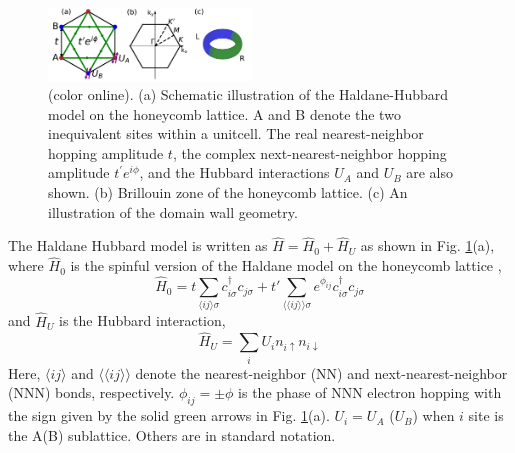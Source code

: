 \documentclass[amsmath,superscriptaddress,showpacs,aps,prl,twocolumn]{revtex4-1}
\begin{document}
\begin{figure}
\centering
\includegraphics[width=0.48\textwidth]{lattice}
\caption{(color online). (a) Schematic illustration of the Haldane-Hubbard model on the honeycomb lattice. A and B denote the two inequivalent sites within a unitcell. The real nearest-neighbor hopping amplitude $t$, the complex next-nearest-neighbor hopping amplitude $t^\prime e^{i\phi}$, and the Hubbard interactions $U_A$ and $U_B$ are also shown. (b) Brillouin zone of the honeycomb lattice. (c) An illustration of the domain wall geometry.}
\label{lattice}
\end{figure}

\par The Haldane Hubbard model is written as $\hat{H}=\hat{H}_0+\hat{H}_U$ as shown in Fig. \ref{lattice}(a), where $\hat{H}_0$ is the spinful version of the Haldane model on the honeycomb lattice \cite{Haldane_PRL1988},
\begin{equation}\label{H0}
\hat{H}_0=t\sum_{\langle ij\rangle\sigma}c^{\dagger}_{i\sigma}c_{j\sigma}+t'\sum_{\langle\langle ij\rangle\rangle\sigma}e^{\phi_{ij}}c^{\dagger}_{i\sigma}c_{j\sigma}
\end{equation}
and $\hat{H}_U$ is the Hubbard interaction,
\begin{equation}\label{HU}
\hat{H}_U=\sum_i U_i n_{i\uparrow}n_{i\downarrow}
\end{equation}
Here, $\langle ij\rangle$ and $\langle\langle ij\rangle\rangle$ denote the nearest-neighbor (NN) and next-nearest-neighbor (NNN) bonds, respectively. $\phi_{ij}=\pm\phi$ is the phase of NNN electron hopping with the sign given by the solid green arrows in Fig. \ref{lattice}(a). $U_i=U_A$ ($U_B$) when $i$ site is the A(B) sublattice. Others are in standard notation.
\end{document}
